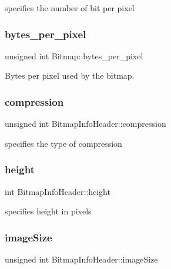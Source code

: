 specifies the number of bit per pixel 

\mbox{\label{group__bitmap_gac4487f25d79f268d5bb0580e68e82b53}} 
\subsubsection{\texorpdfstring{bytes\+\_\+per\+\_\+pixel}{bytes\_per\_pixel}}
{\footnotesize\ttfamily unsigned int Bitmap\+::bytes\+\_\+per\+\_\+pixel}



Bytes per pixel used by the bitmap. 

\mbox{\label{group__bitmap_ga87fb38b0fe68db4bed899b9733d1b7e9}} 
\subsubsection{\texorpdfstring{compression}{compression}}
{\footnotesize\ttfamily unsigned int Bitmap\+Info\+Header\+::compression}



specifies the type of compression 

\mbox{\label{group__bitmap_gaaa1d31efc13210020a38d435e4961df9}} 
\subsubsection{\texorpdfstring{height}{height}}
{\footnotesize\ttfamily int Bitmap\+Info\+Header\+::height}



specifies height in pixels 

\mbox{\label{group__bitmap_ga79bc984a7fd1c0f00ede6aa09143939f}} 
\subsubsection{\texorpdfstring{image\+Size}{imageSize}}
{\footnotesize\ttfamily unsigned int Bitmap\+Info\+Header\+::image\+Size}



